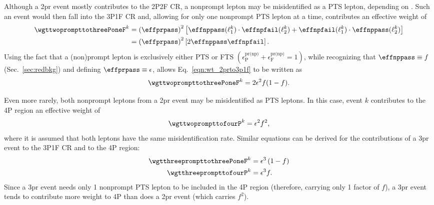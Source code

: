Although a 2pr event mostly contributes to the 2P2F CR, a nonprompt lepton may be misidentified as a PTS lepton, depending on \effnppass.
Such an event would then fall into the 3P1F CR and, allowing for only one nonprompt PTS lepton at a time, contributes an effective weight of
\begin{align}
	\label{eqn:wt_2prto3p1f}
	\wgttwoprompttothreePoneF^k
	&= \left( \effprpass \right)^2 
	\left[
		\effnppass(\ell_1^k) \cdot \effnpfail(\ell_2^k) + \effnpfail(\ell_1^k) \cdot \effnppass(\ell_2^k)
	\right]
	\notag
	\\
	&= \left( \effprpass \right)^2
	\left[
		2 \effnppass \effnpfail
	\right].
\end{align}
Using the fact that a (non)prompt lepton is exclusively either PTS or FTS
$\left( \epsilon^\text{pr(np)}_\text{P} + \epsilon^\text{pr(np)}_\text{F} = 1 \right)$,
while recognizing that $\effnppass \equiv f$ (Sec.~\ref{sec:redbkg}) and defining $\effprpass \equiv \epsilon$,
allows Eq.~\ref{eqn:wt_2prto3p1f} to be written as
\begin{equation}
	\label{eqn:wt_2prto3p1f_simp}
	\wgttwoprompttothreePoneF^k = 2 \epsilon^2 f (1-f).
\end{equation}

Even more rarely, both nonprompt leptons from a 2pr event may be misidentified as PTS leptons.
In this case, event $k$ contributes to the 4P region an effective weight of
\begin{equation}
	\label{eqn:wt_2prto4p}
	\wgttwoprompttofourP^k = \epsilon^2 f^2,
\end{equation}
where it is assumed that both leptons have the same misidentification rate.
Similar equations can be derived for the contributions of a 3pr event to the 3P1F CR and to the 4P region:
\begin{align}
	\label{eqn:wt_3prto3p1f}
	\wgtthreeprompttothreePoneF^k &= \epsilon^3 \left( 1-f \right)
	\\
	\label{eqn:wt_3prto4p}
	\wgtthreeprompttofourP^k &= \epsilon^3 f.
\end{align}
Since a 3pr event needs only 1 nonprompt PTS lepton to be included in the 4P region (therefore, carrying only 1 factor of $f$), a 3pr event tends to contribute more weight to 4P than does a 2pr event (which carries $f^2$).

